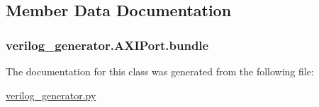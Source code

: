 \subsection{Member Data Documentation}
\hypertarget{classverilog__generator_1_1AXIPort_a12216f6df7bee0b17bda71de5843b476}{
\subsubsection[{bundle}]{\setlength{\rightskip}{0pt plus 5cm}verilog\-\_\-generator.\-A\-X\-I\-Port.\-bundle}}\label{classverilog__generator_1_1AXIPort_a12216f6df7bee0b17bda71de5843b476}


The documentation for this class was generated from the following file\-:\begin{DoxyCompactItemize}
\item 
\hyperlink{verilog__generator_8py}{verilog\-\_\-generator.\-py}\end{DoxyCompactItemize}
